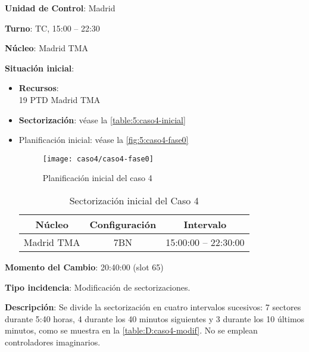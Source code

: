 \textbf{Unidad de Control}: Madrid

\textbf{Turno}: TC, 15:00 -- 22:30

\textbf{Núcleo}: Madrid TMA

\textbf{Situación inicial}:
\begin{itemize}[label={}]
	
	\item \textbf{Recursos}: \\
	19 PTD Madrid TMA
	
	
	\item \textbf{Sectorización}: véase la \autoref{table:5:caso4-inicial}
	
	\item Planificación inicial: véase la \autoref{fig:5:caso4-fase0}
	
	\begin{figure}[!h]
		\centering
		\texttt{[image: caso4/caso4-fase0]}
		\caption{Planificación inicial del caso 4}
		\label{fig:5:caso4-fase0}
	\end{figure}

	\begin{table}[h]
		\centering
		\caption{Sectorización inicial del Caso 4}
		\label{table:5:caso4-inicial}
		\begin{tabular}{ccc}
			\hline
			\textbf{Núcleo} & \textbf{Configuración} & \textbf{Intervalo} \\ \hline
			Madrid TMA             & 7BN                                      & 15:00:00 -- 22:30:00                \\ \hline
		\end{tabular}
	\end{table}
\end{itemize}

\textbf{Momento del Cambio}: 20:40:00  (slot 65)

\textbf{Tipo incidencia}: Modificación de sectorizaciones.

\textbf{Descripción}: Se divide la sectorización en cuatro intervalos sucesivos: 7 sectores durante 5:40 horas, 4 durante los 40 minutos siguientes y 3 durante los 10 últimos minutos, como se muestra en la \autoref{table:D:caso4-modif}. No se emplean controladores imaginarios.

